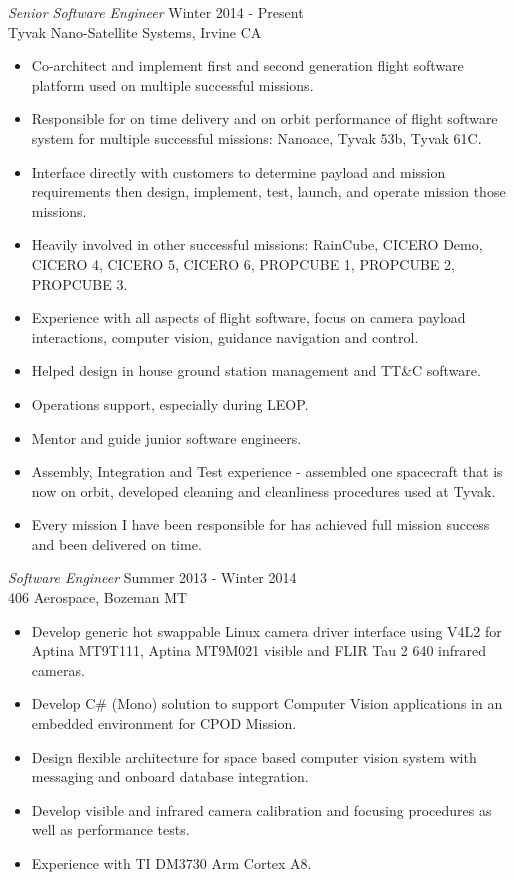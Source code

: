 \documentclass[line,margin]{res}
\begin{document}
\begin{resume}
				{\sl Senior Software Engineer} \hfill Winter 2014 - Present \\
				 Tyvak Nano-Satellite Systems, Irvine CA
				\begin{itemize}  \itemsep -2pt %
					\item Co-architect and implement first and second generation flight software platform used on multiple successful missions.
					\item Responsible for on time delivery and on orbit performance of flight software system for multiple successful missions: Nanoace, Tyvak 53b, Tyvak 61C.
					\item Interface directly with customers to determine payload and mission requirements then design, implement, test, launch, and operate mission those missions.
					\item Heavily involved in other successful missions: RainCube, CICERO Demo, CICERO 4, CICERO 5, CICERO 6, PROPCUBE 1, PROPCUBE 2, PROPCUBE 3.
					\item Experience with all aspects of flight software, focus on camera payload interactions, computer vision, guidance navigation and control.
					\item Helped design in house ground station management and TT\&C software.
					\item Operations support, especially during LEOP.
					\item Mentor and guide junior software engineers.
					\item Assembly, Integration and Test experience - assembled one spacecraft that is now on orbit, developed cleaning and cleanliness procedures used at Tyvak.
					\item Every mission I have been responsible for has achieved full mission success and been delivered on time.
				\end{itemize}

				{\sl Software Engineer} \hfill Summer 2013 - Winter 2014 \\
                  406 Aerospace, Bozeman MT
                 \begin{itemize}  \itemsep -2pt %
                 \item Develop generic hot swappable Linux camera driver interface using V4L2 for Aptina MT9T111, Aptina MT9M021 visible and FLIR Tau 2 640 infrared cameras. 
                 \item Develop C\# (Mono) solution to support Computer Vision applications in an embedded environment for CPOD Mission.
                 \item Design flexible architecture for space based computer vision system with messaging and onboard database integration.
                 \item Develop visible and infrared camera calibration and focusing procedures as well as performance tests.
                 \item Experience with TI DM3730 Arm Cortex A8.
                 

\end{itemize}
\end{resume}
\end{document}

